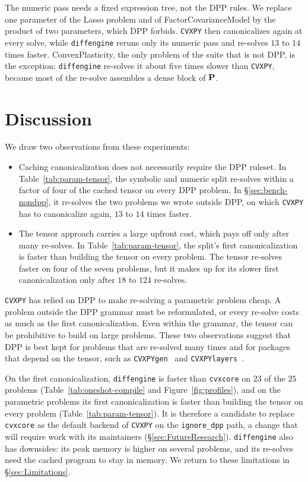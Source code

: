 \label{sec:bench-nondpp}%
The numeric pass needs a fixed expression tree, not the \ac{DPP} rules. We replace one
parameter of the Lasso problem and of FactorCovarianceModel by the product of two parameters,
which \ac{DPP} forbids. \texttt{CVXPY} then canonicalizes again at every solve, while
\texttt{diffengine} reruns only its numeric pass and re-solves $13$ to $14$ times faster.
ConvexPlasticity, the only problem of the suite that is not \ac{DPP}, is the exception:
\texttt{diffengine} re-solves it about five times slower than \texttt{CVXPY}, because most of the
re-solve assembles a dense block of $\mathbf{P}$.

\FloatBarrier

\section{Discussion}
\label{sec:bench-summary}

We draw two observations from these experiments:
\begin{itemize}
\item Caching canonicalization does not necessarily require the \ac{DPP} ruleset. In
Table~\ref{tab:param-tensor}, the symbolic and numeric split re-solves within a factor of
four of the cached tensor on every \ac{DPP} problem. In
\S\ref{sec:bench-nondpp}, it re-solves the two problems we wrote outside \ac{DPP}, on which
\texttt{CVXPY} has to canonicalize again, $13$ to $14$ times faster.
\item The tensor approach carries a large upfront cost, which pays off only after many
re-solves. In
Table~\ref{tab:param-tensor}, the split's first canonicalization is faster than building
the tensor on every problem. The tensor re-solves faster on four of the seven problems, but
it makes up for its slower first canonicalization only after $18$ to $124$ re-solves.
\end{itemize}

\texttt{CVXPY} has relied on \ac{DPP} to make re-solving a parametric problem cheap. A problem
outside the \ac{DPP} grammar must be reformulated, or every re-solve costs as much as the first
canonicalization. Even within the grammar, the tensor can be prohibitive to build on large
problems. These two observations suggest that \ac{DPP} is best kept for problems that are
re-solved many times and for packages that depend on the tensor, such as
\texttt{CVXPYgen}~\cite{schaller2022cvxpygen} and \texttt{CVXPYlayers}~\cite{agrawal2019dpp}.

On the first canonicalization, \texttt{diffengine} is faster than \texttt{cvxcore} on $23$ of
the $25$ problems (Table~\ref{tab:oneshot-compile} and Figure~\ref{fig:profiles}), and on the
parametric problems its first canonicalization is faster than building the tensor on every
problem (Table~\ref{tab:param-tensor}). It is therefore a candidate to replace \texttt{cvxcore}
as the default backend of \texttt{CVXPY} on the \texttt{ignore\_dpp} path, a change that will
require work with its maintainers (\S\ref{sec:FutureResearch}).
\texttt{diffengine} also has downsides: its
peak memory is higher on several problems, and its re-solves need the cached program to stay in
memory. We return to these
limitations in \S\ref{sec:Limitations}.
